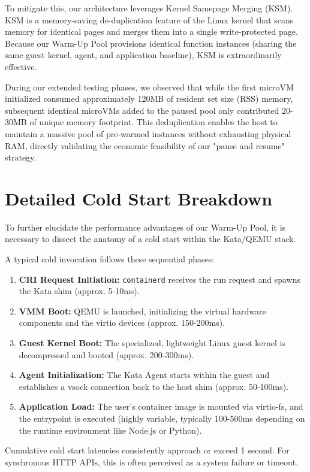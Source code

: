 \documentclass[12pt,a4paper]{report}
\begin{document}
To mitigate this, our architecture leverages Kernel Samepage Merging (KSM). KSM is a memory-saving de-duplication feature of the Linux kernel that scans memory for identical pages and merges them into a single write-protected page. Because our Warm-Up Pool provisions identical function instances (sharing the same guest kernel, agent, and application baseline), KSM is extraordinarily effective.

During our extended testing phases, we observed that while the first microVM initialized consumed approximately 120MB of resident set size (RSS) memory, subsequent identical microVMs added to the paused pool only contributed 20-30MB of unique memory footprint. This deduplication enables the host to maintain a massive pool of pre-warmed instances without exhausting physical RAM, directly validating the economic feasibility of our "pause and resume" strategy.

\section{Detailed Cold Start Breakdown}
To further elucidate the performance advantages of our Warm-Up Pool, it is necessary to dissect the anatomy of a cold start within the Kata/QEMU stack.

A typical cold invocation follows these sequential phases:
\begin{enumerate}
    \item \textbf{CRI Request Initiation:} \texttt{containerd} receives the run request and spawns the Kata shim (approx. 5-10ms).
    \item \textbf{VMM Boot:} QEMU is launched, initializing the virtual hardware components and the virtio devices (approx. 150-200ms).
    \item \textbf{Guest Kernel Boot:} The specialized, lightweight Linux guest kernel is decompressed and booted (approx. 200-300ms).
    \item \textbf{Agent Initialization:} The Kata Agent starts within the guest and establishes a vsock connection back to the host shim (approx. 50-100ms).
    \item \textbf{Application Load:} The user's container image is mounted via virtio-fs, and the entrypoint is executed (highly variable, typically 100-500ms depending on the runtime environment like Node.js or Python).
\end{enumerate}

Cumulative cold start latencies consistently approach or exceed 1 second. For synchronous HTTP APIs, this is often perceived as a system failure or timeout.
\end{document}

